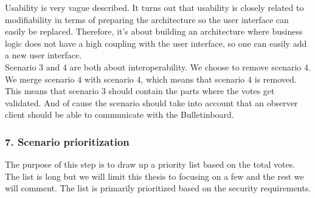 \noindent
Usability is very vague described. It turns out that usability is closely related to modifiability in terms of preparing the architecture so the user interface can easily be replaced. Therefore, it's about building an architecture where business logic does not have a high coupling with the user interface, so one can easily add a new user interface. \\ 

\noindent
Scenario $3$ and $4$ are both about interoperability. We choose to remove scenario $4$.  We merge scenario $4$ with scenario $4$, which means that scenario $4$ is removed. This means that scenario $3$ should contain the parts where the votes get validated. And of cause the scenario should take into account that an observer client should be able to communicate with the Bulletinboard.



\subsubsection{7. Scenario prioritization}
The purpose of this step is to draw up a priority list based on the total votes. The list is long but we will limit this thesis to focusing on a few and the rest we will comment. The list is primarily prioritized based on the security requirements.

